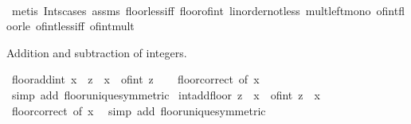 \begin{isabellebody}
%
\isadelimproof
\ \ %
\endisadelimproof
%
\isatagproof
{}\isamarkupfalse%
\ {\isacharparenleft}{\kern0pt}metis\ Ints{\isacharunderscore}{\kern0pt}cases\ assms\ floor{\isacharunderscore}{\kern0pt}less{\isacharunderscore}{\kern0pt}iff\ floor{\isacharunderscore}{\kern0pt}of{\isacharunderscore}{\kern0pt}int\ linorder{\isacharunderscore}{\kern0pt}not{\isacharunderscore}{\kern0pt}less\ mult{\isacharunderscore}{\kern0pt}left{\isacharunderscore}{\kern0pt}mono\ of{\isacharunderscore}{\kern0pt}int{\isacharunderscore}{\kern0pt}floor{\isacharunderscore}{\kern0pt}le\ of{\isacharunderscore}{\kern0pt}int{\isacharunderscore}{\kern0pt}less{\isacharunderscore}{\kern0pt}iff\ of{\isacharunderscore}{\kern0pt}int{\isacharunderscore}{\kern0pt}mult{\isacharparenright}{\kern0pt}%
\endisatagproof
{\isafoldproof}%
%
\isadelimproof
%
\endisadelimproof
%
\begin{isamarkuptext}%
Addition and subtraction of integers.%
\end{isamarkuptext}\isamarkuptrue%
\isamarkupfalse%
\ floor{\isacharunderscore}{\kern0pt}add{\isacharunderscore}{\kern0pt}int{\isacharcolon}{\kern0pt}\ {\isachardoublequoteopen}{\isasymlfloor}x{\isasymrfloor}\ {\isacharplus}{\kern0pt}\ z\ {\isacharequal}{\kern0pt}\ {\isasymlfloor}x\ {\isacharplus}{\kern0pt}\ of{\isacharunderscore}{\kern0pt}int\ z{\isasymrfloor}{\isachardoublequoteclose}\isanewline
%
\isadelimproof
\ \ %
\endisadelimproof
%
\isatagproof
{}\isamarkupfalse%
\ floor{\isacharunderscore}{\kern0pt}correct\ {\isacharbrackleft}{\kern0pt}of\ x{\isacharbrackright}{\kern0pt}\ \isamarkupfalse%
\ {\isacharparenleft}{\kern0pt}simp\ add{\isacharcolon}{\kern0pt}\ floor{\isacharunderscore}{\kern0pt}unique{\isacharbrackleft}{\kern0pt}symmetric{\isacharbrackright}{\kern0pt}{\isacharparenright}{\kern0pt}%
\endisatagproof
{\isafoldproof}%
%
\isadelimproof
\isanewline
%
\endisadelimproof
\isanewline
{}\isamarkupfalse%
\ int{\isacharunderscore}{\kern0pt}add{\isacharunderscore}{\kern0pt}floor{\isacharcolon}{\kern0pt}\ {\isachardoublequoteopen}z\ {\isacharplus}{\kern0pt}\ {\isasymlfloor}x{\isasymrfloor}\ {\isacharequal}{\kern0pt}\ {\isasymlfloor}of{\isacharunderscore}{\kern0pt}int\ z\ {\isacharplus}{\kern0pt}\ x{\isasymrfloor}{\isachardoublequoteclose}\isanewline
%
\isadelimproof
\ \ %
\endisadelimproof
%
\isatagproof
{}\isamarkupfalse%
\ floor{\isacharunderscore}{\kern0pt}correct\ {\isacharbrackleft}{\kern0pt}of\ x{\isacharbrackright}{\kern0pt}\ \isamarkupfalse%
\ {\isacharparenleft}{\kern0pt}simp\ add{\isacharcolon}{\kern0pt}\ floor{\isacharunderscore}{\kern0pt}unique{\isacharbrackleft}{\kern0pt}symmetric{\isacharbrackright}{\kern0pt}{\isacharparenright}{\kern0pt}%

\end{isabellebody}
